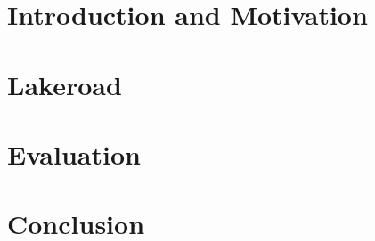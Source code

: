 \chapter{Introduction and Motivation}
\label{chapter:part2-intro}



\chapter{Lakeroad}
\label{chapter:part2-lakeroad-detail}




\chapter{Evaluation}






\chapter*{ Conclusion}

%

